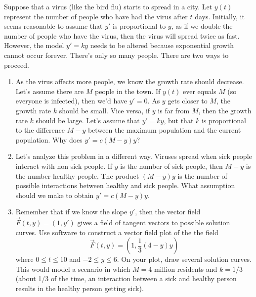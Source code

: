 \begin{problem}
 Suppose that a virus (like the bird flu) starts to spread in a city. Let $y(t)$ represent the number of people who have had the virus after $t$ days.  Initially, it seems reasonable to assume that $y'$ is proportional to $y$, as if we double the number of people who have the virus, then the virus will spread twice as fast. However, the model $y'=ky$ needs to be altered because exponential growth cannot occur forever.  There's only so many people. There are two ways to proceed.
\begin{enumerate}
\item 
{}%
As the virus affects more people, we know the growth rate should decrease. Let's assume there are $M$ people in the town. If $y(t)$ ever equals $M$ (so everyone is infected), then we'd have $y'=0$. As $y$ gets closer to $M$, the growth rate $k$ should be small. Vice versa, if $y$ is far from $M$, then the growth rate $k$ should be large. Let's assume that $y'=ky$, but that $k$ is proportional to the difference $M-y$ between the maximum population and the current population. Why does $y'=c(M-y)y$?
\item Let's analyze this problem in a different way. 
Viruses spread when sick people interact with non sick people.  If $y$ is the number of sick people, then $M-y$ is the number healthy people. The product $(M-y)y$ is the number of possible interactions between healthy and sick people. What assumption should we make to obtain $y'=c(M-y)y$.
\item
{}%
Remember that if we know the slope $y'$, then the vector field $\vec F(t,y) = (1,y')$ gives a field of tangent vectors to possible solution curves. Use software to construct a vector field plot of the the field $$\vec F(t,y) = (1,\frac{1}{3}(4-y)y)$$ where $0\leq t\leq 10$ and $-2\leq y\leq 6$. On your plot, draw several solution curves. This would model a scenario in which $M=4$ million residents and $k=1/3$ (about 1/3 of the time, an interaction between a sick and healthy person results in the healthy person getting sick). 
\end{enumerate}

\end{problem}




